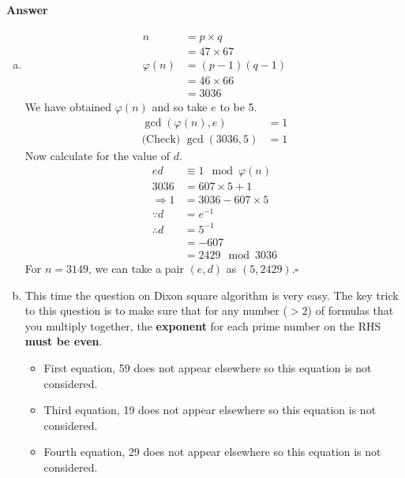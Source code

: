 \documentclass[12pt]{article}
\begin{document}
\paragraph{Answer}
\begin{enumerate}[(a)]
\item \begin{equation*}
\begin{split}
n&=p\times q\\
&=47\times 67\\
\varphi(n)&=(p-1)(q-1)\\
&=46\times 66\\
&=3036
\end{split}
\end{equation*}
We have obtained $\varphi(n)$ and so take $e$ to be 5.
\begin{equation*}
\begin{split}
\gcd(\varphi(n),e)&=1\\
\text{(Check) }\gcd(3036,5)&=1
\end{split}
\end{equation*}
Now calculate for the value of $d$.
\begin{equation*}
\begin{split}
ed&\equiv 1\mod \varphi(n)\\
3036&=607\times 5+1\\
\Rightarrow 1&=3036-607\times 5\\
\because d&=e^{-1}\\\therefore d&=5^{-1}\\&=-607\\&=2429\mod 3036
\end{split}
\end{equation*}
For $n=3149$, we can take a pair $(e,d)$ as $(5,2429).$\hfill $\square$
\item This time the question on Dixon square algorithm is very easy. The key trick to this question is to make sure that for any number ($>2$) of formulas that you multiply together, the \textbf{exponent} for each prime number on the RHS \textbf{must be even}. 
\begin{itemize}
\item First equation, 59 does not appear elsewhere so this equation is not considered.
\item Third equation, 19 does not appear elsewhere so this equation is not considered.
\item Fourth equation, 29 does not appear elsewhere so this equation is not considered.
\end{itemize}

\end{enumerate}
\end{document}
